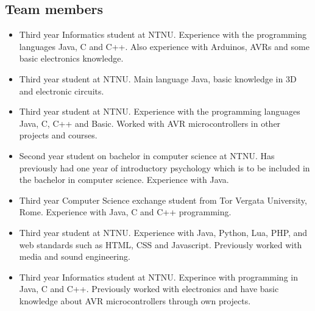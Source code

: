\subsection{Team members}

\begin{itemize}
\item{\anders}\newline
Third year Informatics student at NTNU. Experience with the programming languages Java,
C and C++. Also experience with Arduinos, AVRs and some basic electronics knowledge.

\item{\henrik}\newline
Third year student at NTNU. Main language Java, basic knowledge in 3D and electronic circuits.

\item{\johan}\newline
Third year student at NTNU. Experience with the programming languages Java, C, C++  and
Basic. Worked with AVR microcontrollers in other projects and courses.

\item{\asbjorn}\newline
Second year student on bachelor in computer science at NTNU. Has previously had one year of
introductory psychology which is to be included in the bachelor in computer science.
Experience with Java.

\item{\emanuele}\newline
Third year Computer Science exchange student from Tor Vergata University, Rome.
Experience with Java, C and C++ programming.

\item{\jonas}\newline
Third year student at NTNU. Experience with Java, Python, Lua, PHP, and web standards such as HTML,
CSS and Javascript. Previously worked with media and sound engineering.

\item{\bjornar}\newline
Third year Informatics student at NTNU. Experince with programming in Java, C and C++.
Previously worked with electronics and have basic knowledge about AVR microcontrollers through
own projects.
\end{itemize}
